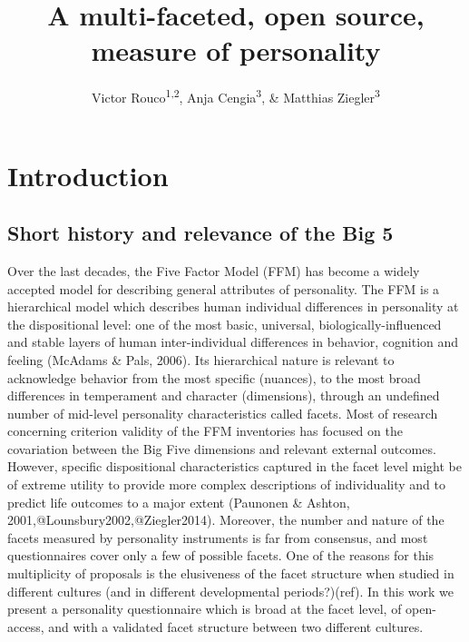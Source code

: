 \documentclass[man]{apa6}
\title{A multi-faceted, open source, measure of personality}
\author{Victor Rouco\textsuperscript{1,2}, Anja Cengia\textsuperscript{3}, \& Matthias Ziegler\textsuperscript{3}}
\affiliation{
    \vspace{0.5cm}
          \textsuperscript{1} Universitat de Barcelona\\
          \textsuperscript{2} Institut de Neurociencies Barcelona\\
          \textsuperscript{3} Humboldt Universität zu Berlin  }
\theoremstyle{definition}
\theoremstyle{definition}
\theoremstyle{definition}
\theoremstyle{remark}
\begin{document}
\maketitle

\setcounter{secnumdepth}{0}



\hypertarget{introduction}{%
\section{Introduction}\label{introduction}}

\hypertarget{short-history-and-relevance-of-the-big-5}{%
\subsection{Short history and relevance of the Big
5}\label{short-history-and-relevance-of-the-big-5}}

Over the last decades, the Five Factor Model (FFM) has become a widely
accepted model for describing general attributes of personality. The FFM
is a hierarchical model which describes human individual differences in
personality at the dispositional level: one of the most basic,
universal, biologically-influenced and stable layers of human
inter-individual differences in behavior, cognition and feeling (McAdams
\& Pals, 2006). Its hierarchical nature is relevant to acknowledge
behavior from the most specific (nuances), to the most broad differences
in temperament and character (dimensions), through an undefined number
of mid-level personality characteristics called facets. Most of research
concerning criterion validity of the FFM inventories has focused on the
covariation between the Big Five dimensions and relevant external
outcomes. However, specific dispositional characteristics captured in
the facet level might be of extreme utility to provide more complex
descriptions of individuality and to predict life outcomes to a major
extent (Paunonen \& Ashton, 2001,@Lounsbury2002,@Ziegler2014). Moreover,
the number and nature of the facets measured by personality instruments
is far from consensus, and most questionnaires cover only a few of
possible facets. One of the reasons for this multiplicity of proposals
is the elusiveness of the facet structure when studied in different
cultures (and in different developmental periods?)(ref). In this work we
present a personality questionnaire which is broad at the facet level,
of open-access, and with a validated facet structure between two
different cultures.
\end{document}
